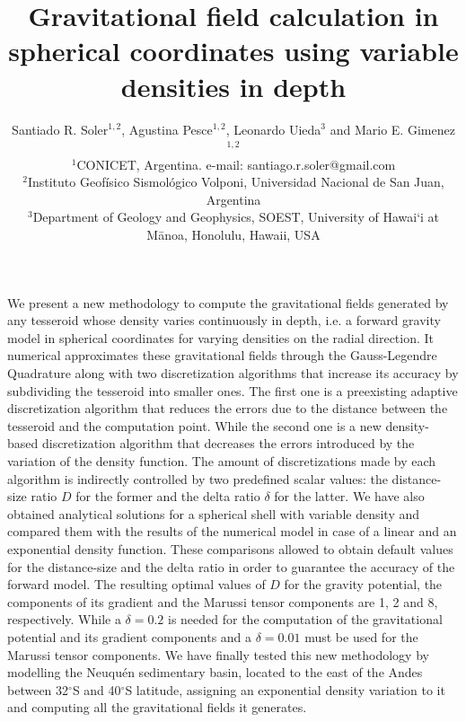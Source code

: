 \documentclass[extra]{gji}
\begin{document}
\title[Variable Density Tesseroids]{
    Gravitational field calculation in spherical coordinates using variable
    densities in depth
}
\author[S.R. Soler, A. Pesce, L. Uieda and M.E. Gimenez]{
    Santiado R. Soler$^{1,2}$, Agustina Pesce$^{1,2}$, Leonardo Uieda$^3$ and
    Mario E. Gimenez$^{1,2}$ \\
    $^1$CONICET, Argentina. e-mail: santiago.r.soler@gmail.com\\
    $^2$Instituto Geofísico Sismológico Volponi, Universidad Nacional de
    San Juan, Argentina\\
    $^3$Department of Geology and Geophysics, SOEST, University of Hawai‘i at
    M\={a}noa, Honolulu, Hawaii, USA
}


\maketitle

\begin{summary}
We present a new methodology to compute the gravitational fields generated by
any tesseroid whose density varies continuously in depth, i.e. a forward
gravity model in spherical coordinates for varying densities on the radial
direction.
It numerical approximates these gravitational fields through the
Gauss-Legendre Quadrature along with two discretization algorithms that
increase its accuracy by subdividing the tesseroid into smaller ones.
The first one is a preexisting adaptive discretization algorithm that reduces
the errors due to the distance between the tesseroid and the computation
point.
While the second one  is a new density-based discretization algorithm that
decreases the errors introduced by the variation of the density function.
The amount of discretizations made by each algorithm is indirectly controlled
by two predefined scalar values: the distance-size ratio $D$ for the former
and the delta ratio $\delta$ for the latter.
We have also obtained analytical solutions for a spherical shell with variable
density and compared them with the results of the numerical model in case of a
linear and an exponential density function.
These comparisons allowed to obtain default values for the distance-size and
the delta ratio in order to guarantee the accuracy of the forward model.
The resulting optimal values of $D$ for the gravity potential, the components
of its gradient and the Marussi tensor components are 1, 2 and 8,
respectively.
While a $\delta=0.2$ is needed for the computation of the gravitational
potential and its gradient components and a $\delta=0.01$ must be used for
the Marussi tensor components.
We have finally tested this new methodology by modelling the Neuqu\'en
sedimentary basin, located to the east of the Andes between 32$^\circ$S and
40$^\circ$S latitude, assigning an exponential density variation to it and
computing all the gravitational fields it generates.
\end{summary}
\end{document}
